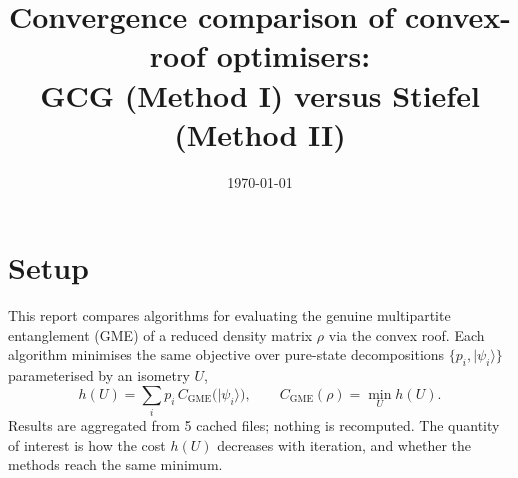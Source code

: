 \documentclass[11pt]{article}
\title{Convergence comparison of convex-roof optimisers:\\ GCG (Method I) versus Stiefel (Method II)}
\author{}
\date{\today}
\begin{document}
\maketitle
\section{Setup}
This report compares algorithms for evaluating the genuine multipartite entanglement (GME) of a reduced density matrix $\rho$ via the convex roof. Each algorithm minimises the same objective over pure-state decompositions $\{p_i,|\psi_i\rangle\}$ parameterised by an isometry $U$,
\begin{equation}h(U)=\sum_i p_i\, C_{\mathrm{GME}}\big(|\psi_i\rangle\big),\qquad C_{\mathrm{GME}}(\rho)=\min_{U} h(U).\end{equation}
Results are aggregated from 5 cached files; nothing is recomputed. The quantity of interest is how the cost $h(U)$ decreases with iteration, and whether the methods reach the same minimum.
\begin{table}[H]\centering
\caption{System and optimiser configuration.}

\end{table}
\begin{table}[H]\centering
\caption{Properties of the reduced density matrices used as input.}

\end{table}
\end{document}
